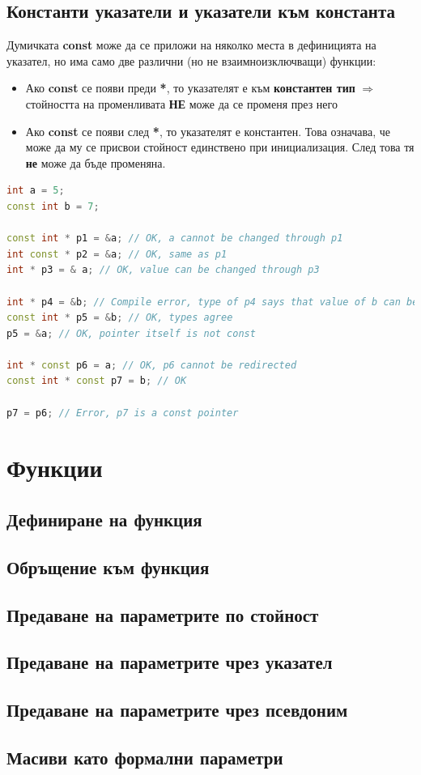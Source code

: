 \documentclass[fleqn,12pt]{article}
\begin{document}
\subsection{Константи указатели и указатели към константа}
Думичката \textbf{const} може да се приложи на няколко места в дефиницията на указател, но има само две различни (но не взаимноизключващи) функции:
\begin{itemize}
    \item Ако \textbf{const} се появи преди \textbf{*}, то указателят е към \textbf{константен тип} $\Rightarrow$ стойността на променливата \textbf{НЕ} може да се променя през него
    \item Ако \textbf{const} се появи след \textbf{*}, то указателят е константен. Това означава, че може да му се присвои стойност единствено при инициализация. След това тя \textbf{не} може да бъде променяна.
\end{itemize}

\begin{lstlisting}[language=C++, caption=Multidimensional pointers 2]
int a = 5;
const int b = 7;

const int * p1 = &a; // OK, a cannot be changed through p1
int const * p2 = &a; // OK, same as p1
int * p3 = & a; // OK, value can be changed through p3

int * p4 = &b; // Compile error, type of p4 says that value of b can be changed through it, but b is const
const int * p5 = &b; // OK, types agree
p5 = &a; // OK, pointer itself is not const

int * const p6 = a; // OK, p6 cannot be redirected
const int * const p7 = b; // OK

p7 = p6; // Error, p7 is a const pointer
\end{lstlisting}


\section{Функции}
\subsection{Дефиниране на функция}
\subsection{Обръщение към функция}
\subsection{Предаване на параметрите по стойност}
\subsection{Предаване на параметрите чрез указател}
\subsection{Предаване на параметрите чрез псевдоним}
\subsection{Масиви като формални параметри}
\end{document}
